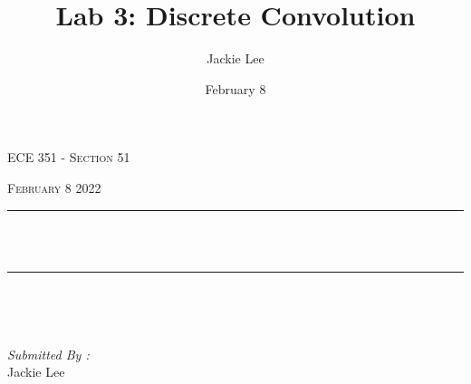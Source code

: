 \documentclass[12pt]{report}
\title{Lab 3: Discrete Convolution}
\author{ Jackie Lee}
\date{February 8}
\makeatletter
\let\thetitle\@title
\makeatother
\begin{document}

\begin{titlepage}
	\centering
    \vspace*{0.5 cm}
\begin{center}    \textsc{\Large   ECE 351 - Section 51 }\\[2.0 cm]	\end{center}%
	\textsc{\Large February 8 2022  }\\[0.5 cm]				%
	\rule{\linewidth}{0.2 mm} \\[0.4 cm]
	{ \huge \bfseries \thetitle}\\
	\rule{\linewidth}{0.2 mm} \\[1.5 cm]
	
	\begin{minipage}{0.4\textwidth}
		\begin{flushleft} \large
			\end{flushleft}
			\end{minipage}~
			\begin{minipage}{0.4\textwidth}
            
			\begin{flushright} \large
			\emph{Submitted By :} \\
			Jackie Lee  
		\end{flushright}
           
	\end{minipage}\\[2 cm]
	
    
    
    
    
	
\end{titlepage}


\tableofcontents
\pagebreak

\renewcommand{\thesection}{\arabic{section}}
\end{document}
